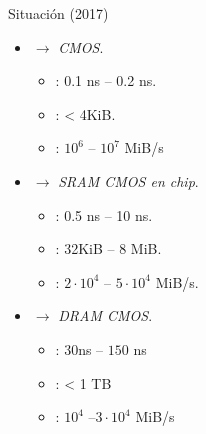 \begin{frame}[t]{Situación (2017)}
\begin{itemize}
  \item {} $\rightarrow$ \emph{CMOS}.
    \begin{itemize}
      \item {}: 0.1 ns -- 0.2 ns.
      \item {}: < 4KiB.
      \item {}: $10^6$ -- $10^7$ MiB/s
    \end{itemize}
  \item {} $\rightarrow$ \emph{SRAM CMOS en chip}.
    \begin{itemize}
      \item {}: 0.5 ns -- 10 ns.
      \item {}: 32KiB -- 8 MiB.
      \item {}: $2 \cdot 10^4$ -- $5 \cdot 10^4$ MiB/s. 
    \end{itemize}

  \item {} $\rightarrow$ \emph{DRAM CMOS}.
    \begin{itemize}
      \item {}: $30$ns -- $150$ ns
      \item {}: < 1 TB
      \item {}: $10^4$ --$3 \cdot 10^4$ MiB/s 
    \end{itemize}

\end{itemize}
\end{frame}

